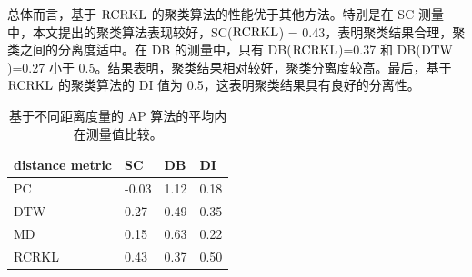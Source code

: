 总体而言，基于 $\rm{RCRKL}$ 的聚类算法的性能优于其他方法。特别是在 SC 测量中，本文提出的聚类算法表现较好，SC($\rm{RCRKL}$) = 0.43，表明聚类结果合理，聚类之间的分离度适中。在 DB 的测量中，只有 DB($\rm{RCRKL}$)=0.37 和 DB($\rm{DTW}$)=0.27 小于 0.5。结果表明，聚类结果相对较好，聚类分离度较高。最后，基于 $\rm{RCRKL}$ 的聚类算法的 DI 值为 0.5，这表明聚类结果具有良好的分离性。

\begin{table}[!ht]
\fontsize{8}{14}\selectfont
\centering
\caption{基于不同距离度量的 AP 算法的平均内在测量值比较。}
\begin{tabular}{llll}
 \hline
 distance metric &  SC & DB & DI\\
  \hline
  PC &  -0.03 & 1.12 &0.18\\
  \hline
  DTW &  0.27 & 0.49 &0.35\\
  \hline
  MD &  0.15 & 0.63 &0.22\\
  \hline
  RCRKL &  0.43 & 0.37 &0.50\\
  \hline
\end{tabular}
\label{table2}
\end{table}

